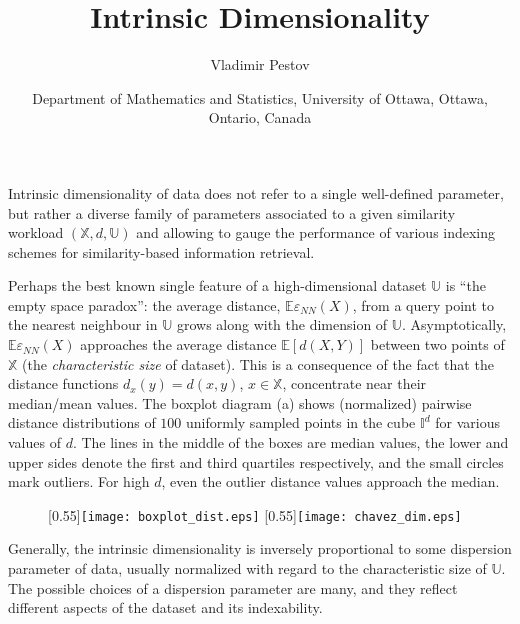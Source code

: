 \documentclass[12pt]{article}
\def\E{{\mathbb{E}}}
\def\e{\varepsilon}
\begin{document}
\title{Intrinsic Dimensionality}

\author{Vladimir Pestov}
\date{\small Department of Mathematics and Statistics, University of Ottawa, Ottawa, Ontario, Canada}


\maketitle

Intrinsic dimensionality of data does not refer to a single well-defined parameter, but rather a diverse family of parameters associated to a given similarity workload $({\mathbb X},d,{\mathbb U})$ and allowing to gauge the performance of various indexing schemes for similarity-based information retrieval.

Perhaps the best known single feature of a high-dimensional dataset $\mathbb U$ is ``the empty space paradox'': the average distance, $\E\e_{NN}(X)$, from a query point to the nearest neighbour in $\mathbb U$ grows along with the dimension of $\mathbb U$. Asymptotically, $\E\e_{NN}(X)$ approaches the average distance $\E [d(X,Y)]$ between two points of $\mathbb X$ (the {\em characteristic size} of dataset). 
This is a consequence of the fact that the distance functions $d_x(y) = d(x,y)$, $x\in{\mathbb X}$, concentrate near their median/mean values. The boxplot diagram (a) shows (normalized) pairwise distance distributions of $100$ uniformly sampled points in the cube ${\mathbb I}^d$ for various values of $d$. The lines in the middle of the boxes are median values, the lower and upper sides denote the first and third quartiles respectively, and the small circles mark outliers. For high $d$, even the outlier distance values approach the median.

\begin{figure}[ht]
\begin{center}
\scalebox{0.55}[0.55]{\texttt{[image: boxplot\_dist.eps]}} 
\scalebox{0.55}[0.55]{\texttt{[image: chavez\_dim.eps]}} 
\end{center}
\end{figure}  

Generally, the intrinsic dimensionality is 
inversely proportional to some dispersion parameter of data, usually normalized with regard to the characteristic size of $\mathbb U$. The possible choices of a dispersion parameter are many, and they reflect different aspects of the dataset and its indexability.

\smallskip
\end{document}
